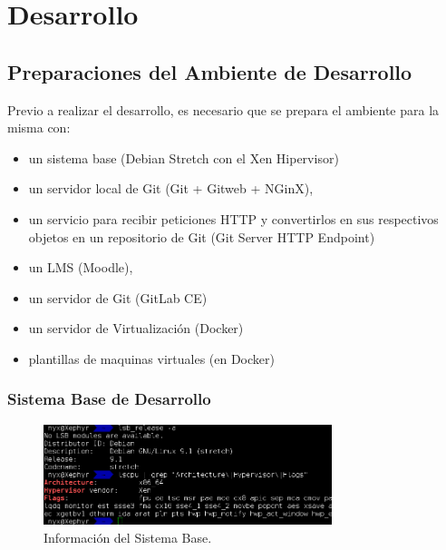

\chapter{Desarrollo}
\label{capitulo4}

        
\section{Preparaciones del Ambiente de Desarrollo}
Previo a realizar el desarrollo, es necesario que se prepara el ambiente para la misma con:
\begin{itemize}
  \item un sistema base (Debian Stretch con el Xen Hipervisor)
  \item un servidor local de Git (Git + Gitweb + NGinX),
  \item un servicio para recibir peticiones HTTP y convertirlos en sus respectivos objetos en un repositorio de Git (Git Server HTTP Endpoint)
  \item un LMS  (Moodle),
  \item un servidor de Git (GitLab CE)
  \item un servidor de Virtualización (Docker)
  \item plantillas de maquinas virtuales (en Docker)
\end{itemize}

\subsection{Sistema Base de Desarrollo}

\begin{figure}
	\begin{center}
    	\includegraphics[width=0.75\textwidth]{Figures/sistema-base.png}
    \end{center}
  	\caption{Información del Sistema Base.}
    \label{sistema-base}
\end{figure}

